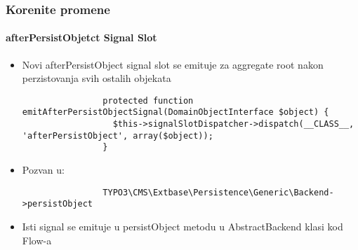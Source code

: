 \begin{frame}[fragile]
	\frametitle{Korenite promene}
	\framesubtitle{afterPersistObjetct Signal Slot}

	\lstset{
		basicstyle=\tiny\ttfamily
	}

	\begin{itemize}

		\item Novi afterPersistObject signal slot se emituje za aggregate root nakon perzistovanja svih ostalih objekata

			\begin{lstlisting}
				protected function emitAfterPersistObjectSignal(DomainObjectInterface $object) {
				  $this->signalSlotDispatcher->dispatch(__CLASS__, 'afterPersistObject', array($object));
				}
			\end{lstlisting}

		\item Pozvan u:

			\begin{lstlisting}
				TYPO3\CMS\Extbase\Persistence\Generic\Backend->persistObject
			\end{lstlisting}

		\item Isti signal se emituje u persistObject metodu u AbstractBackend klasi kod Flow-a

	\end{itemize}

\end{frame}                                                 


